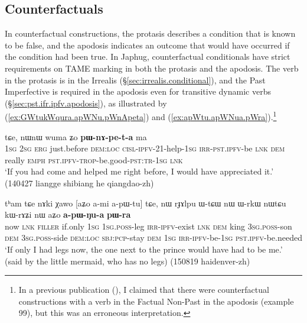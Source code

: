  \subsection{Counterfactuals} \label{sec:counterfactual}
In counterfactual constructions, the protasis describes a condition that is known to be false, and the apodosis indicates an outcome that would have occurred if the condition had been true. In Japhug, counterfactual conditionals have strict requirements on TAME marking in both the protasis and the apodosis. The verb in the protasis is in the  Irrealis (§\ref{sec:irrealis.conditional}), and the Past Imperfective is required in the apodosis even for transitive dynamic verbs (§\ref{sec:pst.ifr.ipfv.apodosis}), as illustrated by (\ref{ex:GWtukWqura.apWNu.pWnApeta}) and (\ref{ex:apWtu.apWNua.pWra}).\footnote{In a previous publication (\citealt[301]{jacques14linking}), I claimed that there were counterfactual constructions with a verb in the Factual Non-Past in the apodosis (example 99), but this was an erroneous interpretation.  }
 
 \begin{exe}
\ex \label{ex:GWtukWqura.apWNu.pWnApeta}
 tɕe, nɯnɯ wuma ʑo \textbf{pɯ-nɤ-pe-t-a} ma \\
\textsc{1sg} \textsc{2sg} \textsc{erg} just.before \textsc{dem}:\textsc{loc} \textsc{cisl}-\textsc{ipfv}-2\fl{}1-help-\textsc{1sg} \textsc{irr}-\textsc{pst}.\textsc{ipfv}-be \textsc{lnk} \textsc{dem} really \textsc{emph} \textsc{pst}.\textsc{ipfv}-\textsc{trop}-be.good-\textsc{pst}:\textsc{tr}-\textsc{1sg} \textsc{lnk} \\
\glt `If you had come and helped me right before, I would have appreciated it.' (140427 liangge shibiang he qiangdao-zh)
\end{exe}
 
\begin{exe}
\ex \label{ex:apWtu.apWNua.pWra}
\gll tʰam tɕe nɤki χawo [aʑo a-mi a-pɯ-tu] tɕe, nɯ rɟɤlpu ɯ-tɕɯ nɯ ɯ-rkɯ nɯtɕu kɯ-rɤʑi nɯ aʑo \textbf{a-pɯ-ŋu-a} \textbf{pɯ-ra} \\
now \textsc{lnk} \textsc{filler} if.only \textsc{1sg} \textsc{1sg}.\textsc{poss}-leg \textsc{irr}-\textsc{ipfv}-exist \textsc{lnk} \textsc{dem} king \textsc{3sg}.\textsc{poss}-son \textsc{dem} \textsc{3sg}.\textsc{poss}-side \textsc{dem}:\textsc{loc} \textsc{sbj}:\textsc{pcp}-stay \textsc{dem} \textsc{1sg} \textsc{irr}-\textsc{ipfv}-be-\textsc{1sg} \textsc{pst}.\textsc{ipfv}-be.needed \\
\glt `If only I had legs now, the one next to the prince would have had to be me.' (said by the little mermaid, who has no legs) (150819 haidenver-zh)
\end{exe}

